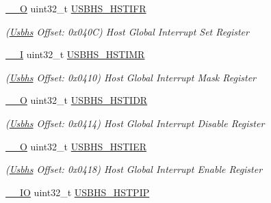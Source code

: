 \begin{DoxyCompactItemize}
\mbox{\hyperlink{core__cm7_8h_a7e25d9380f9ef903923964322e71f2f6}{\+\_\+\+\_\+O}} uint32\+\_\+t \mbox{\hyperlink{structUsbhs_a60a9b6a0c97b661c9d64a26801175161}{U\+S\+B\+H\+S\+\_\+\+H\+S\+T\+I\+FR}}
\begin{DoxyCompactList}\small\item\em (\mbox{\hyperlink{structUsbhs}{Usbhs}} Offset\+: 0x040C) Host Global Interrupt Set Register \end{DoxyCompactList}\item 
\mbox{\label{structUsbhs_a4013d161639e5f517a283e3aae4ddcf1}} 
\mbox{\hyperlink{core__cm7_8h_af63697ed9952cc71e1225efe205f6cd3}{\+\_\+\+\_\+I}} uint32\+\_\+t \mbox{\hyperlink{structUsbhs_a4013d161639e5f517a283e3aae4ddcf1}{U\+S\+B\+H\+S\+\_\+\+H\+S\+T\+I\+MR}}
\begin{DoxyCompactList}\small\item\em (\mbox{\hyperlink{structUsbhs}{Usbhs}} Offset\+: 0x0410) Host Global Interrupt Mask Register \end{DoxyCompactList}\item 
\mbox{\label{structUsbhs_a25515f3d57a591c22130c481c16276ae}} 
\mbox{\hyperlink{core__cm7_8h_a7e25d9380f9ef903923964322e71f2f6}{\+\_\+\+\_\+O}} uint32\+\_\+t \mbox{\hyperlink{structUsbhs_a25515f3d57a591c22130c481c16276ae}{U\+S\+B\+H\+S\+\_\+\+H\+S\+T\+I\+DR}}
\begin{DoxyCompactList}\small\item\em (\mbox{\hyperlink{structUsbhs}{Usbhs}} Offset\+: 0x0414) Host Global Interrupt Disable Register \end{DoxyCompactList}\item 
\mbox{\label{structUsbhs_a393c0f2f1974d8e32eab7255f3b11b37}} 
\mbox{\hyperlink{core__cm7_8h_a7e25d9380f9ef903923964322e71f2f6}{\+\_\+\+\_\+O}} uint32\+\_\+t \mbox{\hyperlink{structUsbhs_a393c0f2f1974d8e32eab7255f3b11b37}{U\+S\+B\+H\+S\+\_\+\+H\+S\+T\+I\+ER}}
\begin{DoxyCompactList}\small\item\em (\mbox{\hyperlink{structUsbhs}{Usbhs}} Offset\+: 0x0418) Host Global Interrupt Enable Register \end{DoxyCompactList}\item 
\mbox{\label{structUsbhs_a982ef246e15c97b313236be297d6f87c}} 
\mbox{\hyperlink{core__cm7_8h_aec43007d9998a0a0e01faede4133d6be}{\+\_\+\+\_\+\+IO}} uint32\+\_\+t \mbox{\hyperlink{structUsbhs_a982ef246e15c97b313236be297d6f87c}{U\+S\+B\+H\+S\+\_\+\+H\+S\+T\+P\+IP}}

\end{DoxyCompactItemize}
